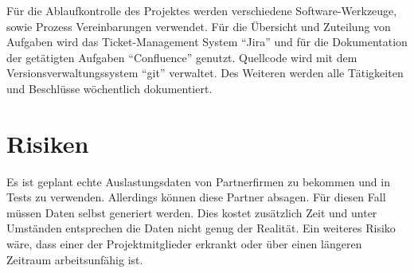 Für die Ablaufkontrolle des Projektes werden verschiedene Software-Werkzeuge,
sowie Prozess Vereinbarungen verwendet. Für die Übersicht und Zuteilung von
Aufgaben wird das Ticket-Management System ``Jira'' und für die Dokumentation
der getätigten Aufgaben ``Confluence'' genutzt. Quellcode wird mit dem
Versionsverwaltungssystem ``git'' verwaltet. Des Weiteren werden alle
Tätigkeiten und Beschlüsse wöchentlich dokumentiert.

\section{Risiken}
Es ist geplant echte Auslastungsdaten von Partnerfirmen zu bekommen und in 
Tests zu verwenden. Allerdings können diese Partner absagen. Für diesen Fall
müssen Daten selbst generiert werden. Dies kostet zusätzlich Zeit und unter
Umständen entsprechen die Daten nicht genug der Realität. Ein weiteres Risiko
wäre, dass einer der Projektmitglieder erkrankt oder über einen längeren
Zeitraum arbeitsunfähig ist.


